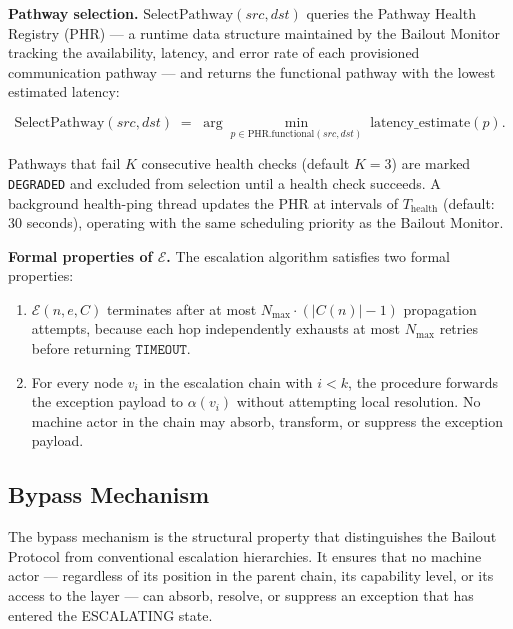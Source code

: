 \bigskip
\noindent\textbf{Pathway selection.} $\text{SelectPathway}(src, dst)$ queries the Pathway Health Registry (PHR) — a runtime data structure maintained by the Bailout Monitor tracking the availability, latency, and error rate of each provisioned communication pathway — and returns the functional pathway with the lowest estimated latency:

\begin{equation}
\text{SelectPathway}(src, dst) \;=\; \arg\min_{p \in \text{PHR.functional}(src, dst)} \; \text{latency\_estimate}(p). \tag{PS}
\end{equation}

Pathways that fail $K$ consecutive health checks (default $K = 3$) are marked \texttt{DEGRADED} and excluded from selection until a health check succeeds. A background health-ping thread updates the PHR at intervals of $T_{\text{health}}$ (default: 30 seconds), operating with the same scheduling priority as the Bailout Monitor.

\bigskip
\noindent\textbf{Formal properties of $\mathcal{E}$.} The escalation algorithm satisfies two formal properties:

\begin{enumerate}
\item[\textbf{Termination.}] $\mathcal{E}(n, e, C)$ terminates after at most $N_{\max} \cdot (|C(n)| - 1)$ propagation attempts, because each hop independently exhausts at most $N_{\max}$ retries before returning $\texttt{TIMEOUT}$.

\item[\textbf{No-absorption.}] For every node $v_i$ in the escalation chain with $i < k$, the  procedure forwards the exception payload to $\alpha(v_i)$ without attempting local resolution. No machine actor in the chain may absorb, transform, or suppress the exception payload.
\end{enumerate}

\subsection{Bypass Mechanism}\label{sec:bypass-mechanism}

The bypass mechanism is the structural property that distinguishes the Bailout Protocol from conventional escalation hierarchies. It ensures that no machine actor — regardless of its position in the parent chain, its capability level, or its access to the \fact{} layer — can absorb, resolve, or suppress an exception that has entered the ESCALATING state.


